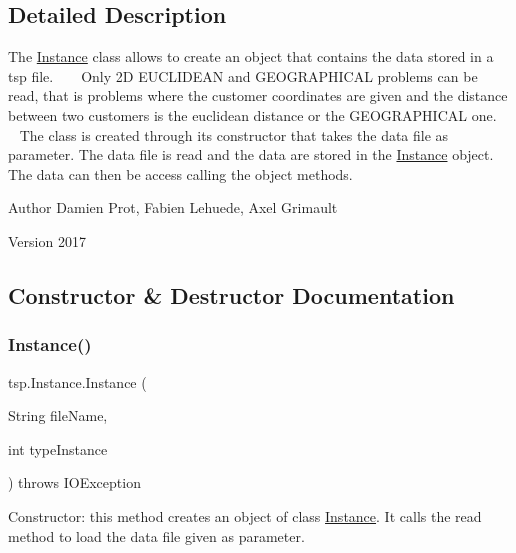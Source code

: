 \subsection{Detailed Description}
The \mbox{\hyperlink{classtsp_1_1_instance}{Instance}} class allows to create an object that contains the data stored in a tsp file. ~\newline
 ~\newline
 Only 2D E\+U\+C\+L\+I\+D\+E\+AN and G\+E\+O\+G\+R\+A\+P\+H\+I\+C\+AL problems can be read, that is problems where the customer coordinates are given and the distance between two customers is the euclidean distance or the G\+E\+O\+G\+R\+A\+P\+H\+I\+C\+AL one. ~\newline
 ~\newline
 The class is created through its constructor that takes the data file as parameter. The data file is read and the data are stored in the \mbox{\hyperlink{classtsp_1_1_instance}{Instance}} object. The data can then be access calling the object methods.

\begin{DoxyAuthor}{Author}
Damien Prot, Fabien Lehuede, Axel Grimault 
\end{DoxyAuthor}
\begin{DoxyVersion}{Version}
2017 
\end{DoxyVersion}


\subsection{Constructor \& Destructor Documentation}
\mbox{\label{classtsp_1_1_instance_ae035e937c11c3832e06cf562f470a21e}} 
\subsubsection{\texorpdfstring{Instance()}{Instance()}}
{\footnotesize\ttfamily tsp.\+Instance.\+Instance (\begin{DoxyParamCaption}\item[{String}]{file\+Name,  }\item[{int}]{type\+Instance }\end{DoxyParamCaption}) throws I\+O\+Exception\hspace{0.3cm}{\ttfamily [inline]}}

Constructor\+: this method creates an object of class \mbox{\hyperlink{classtsp_1_1_instance}{Instance}}. It calls the read method to load the data file given as parameter.



